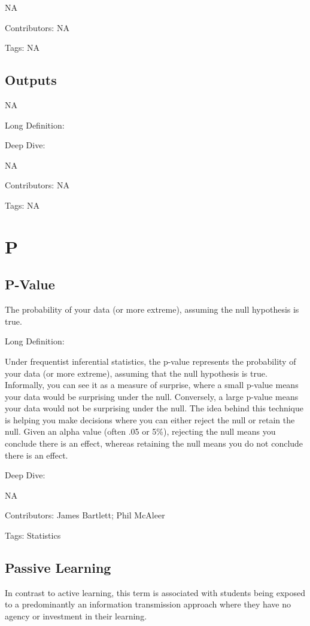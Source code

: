 \documentclass[
  letterpaper,
  DIV=11,
  numbers=noendperiod]{scrreprt}
\begin{document}
NA

Contributors: NA

Tags: NA

\section{Outputs}\label{outputs}

NA

Long Definition:

Deep Dive:

NA

Contributors: NA

Tags: NA


\chapter{P}\label{p}

\section{P-Value}\label{p-value}

The probability of your data (or more extreme), assuming the null
hypothesis is true.

Long Definition:

Under frequentist inferential statistics, the p-value represents the
probability of your data (or more extreme), assuming that the null
hypothesis is true. Informally, you can see it as a measure of surprise,
where a small p-value means your data would be surprising under the
null. Conversely, a large p-value means your data would not be
surprising under the null. The idea behind this technique is helping you
make decisions where you can either reject the null or retain the null.
Given an alpha value (often .05 or 5\%), rejecting the null means you
conclude there is an effect, whereas retaining the null means you do not
conclude there is an effect.

Deep Dive:

NA

Contributors: James Bartlett; Phil McAleer

Tags: Statistics

\section{Passive Learning}\label{passive-learning}

In contrast to active learning, this term is associated with students
being exposed to a predominantly an information transmission approach
where they have no agency or investment in their learning.
\end{document}
